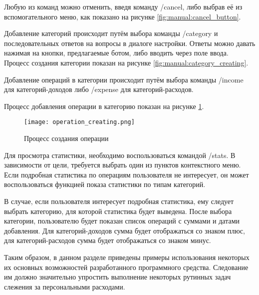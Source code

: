 Любую из команд можно отменить, введя команду /cancel, либо выбрав её из вспомогательного меню, как показано на рисунке \ref{fig:manual:cancel_button}. 

Добавление категорий происходит путём выбора команды /category и последовательных ответов на вопросы в диалоге настройки. Ответы можно давать нажимая на кнопки, предлагаемые ботом, либо вводить через поле ввода. Процесс создания категории показан на рисунке \ref{fig:manual:category_creating}.

Добавление операций в категории происходит путём выбора команды /income для категорий-доходов либо /expense для категорий-расходов.

Процесс добавления операции в категорию показан на рисунке \ref{fig:manual:operation_creating}.

\begin{figure}
\centering
	\texttt{[image: operation\_creating.png]}
	\caption{Процесс создания операции}
	\label{fig:manual:operation_creating}
\end{figure}

Для просмотра статистики, необходимо воспользоваться командой /stats. В зависимости от цели, требуется выбрать один из пунктов контекстного меню. Если подробная статистика по операциям пользователя не интересует, он может воспользоваться функцией показа статистики по типам категорий. 

\newpage

В случае, если пользователя интересует подробная статистика, ему следует выбрать категорию, для которой статистика будет выведена. После выбора категории, пользователю будет показан список операций с суммами и датами добавления. Для категорий-доходов сумма будет отображаться со знаком плюс, для категорий-расходов сумма будет отображаться со знаком минус.

Таким образом, в данном разделе приведены примеры использования некоторых их основных возможностей разработанного программного средства. Следование им должно значительно упростить выполнение некоторых рутинных задач слежения за персональными расходами.
